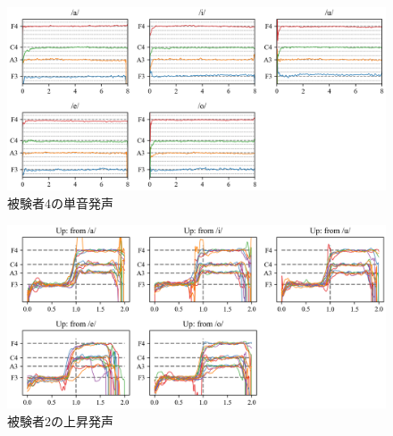 \documentclass[10.5ptj,a4j,dvipdfmx,uplatex, oneside, openany]{jsbook}%
\begin{document}
\begin{figure}[htbp]
    \begin{center}
      \includegraphics[clip,width=16.0cm]{F0_long_4.png}
      \caption{被験者4の単音発声}
      \label{fig:4}
    \end{center}
\end{figure}





\begin{figure}[htbp]
    \begin{center}
      \includegraphics[clip,width=16.0cm]{F0_up_2.png}
      \caption{被験者2の上昇発声}
      \label{fig:u2}
    \end{center}
\end{figure}
\end{document}
